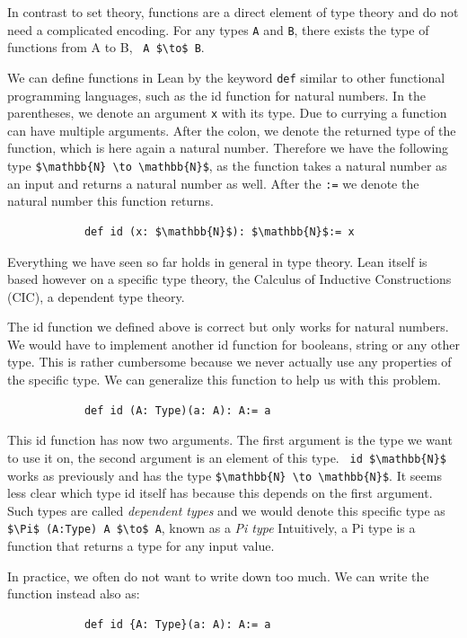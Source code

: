 In contrast to set theory, functions are a direct element of type theory and do not need a complicated encoding. For any types \lstinline|A| and \lstinline|B|, there exists the type of functions from A to B, \lstinline| A $\to$ B|.

We can define functions in Lean by the keyword \lstinline|def| similar to other functional programming languages, such as the id function for natural numbers. In the parentheses, we denote an argument \lstinline|x| with its type. Due to currying a function can have multiple arguments. After the colon, we denote the returned type of the function, which is here again a natural number. Therefore we have the following type \lstinline|$\mathbb{N} \to \mathbb{N}$|, as the function takes a natural number as an input and returns a natural number as well. After the \lstinline|:=| we denote the natural number this function returns. 
\begin{lstlisting}
            def id (x: $\mathbb{N}$): $\mathbb{N}$:= x
\end{lstlisting}

Everything we have seen so far holds in general in type theory. Lean itself is based however on a specific type theory, the Calculus of Inductive Constructions (CIC), a dependent type theory\cite{Lean4, CoC}.

The id function we defined above is correct but only works for natural numbers. We would have to implement another id function for booleans, string or any other type. This is rather cumbersome because we never actually use any properties of the specific type. We can generalize this function to help us with this problem.

\begin{lstlisting}
            def id (A: Type)(a: A): A:= a
\end{lstlisting}

This id function has now two arguments. The first argument is the type we want to use it on, the second argument is an element of this type. \lstinline| id $\mathbb{N}$| works as previously and has the type \lstinline|$\mathbb{N} \to \mathbb{N}$|. It seems less clear which type id itself has because this depends on the first argument.
Such types are called \textit{dependent types} and we would denote this specific type as \lstinline|$\Pi$ (A:Type) A $\to$ A|, known as a \textit{Pi type} Intuitively, a Pi type is a function that returns a type for any input value.

In practice, we often do not want to write down too much. We can write the function instead also as:
\begin{lstlisting}
            def id {A: Type}(a: A): A:= a
\end{lstlisting}

